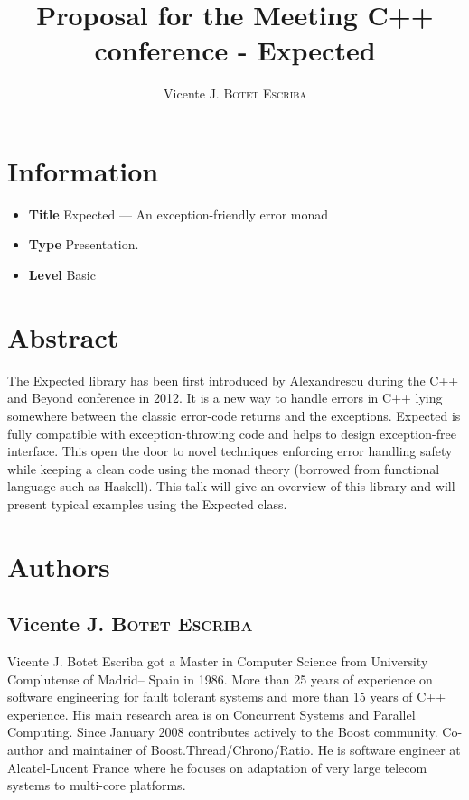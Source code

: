 \documentclass[a4paper,10pt]{article}
\title{Proposal for the Meeting C++ conference - Expected}
\author{ Vicente J. B\textsc{otet} E\textsc{scriba}}
\begin{document}
\maketitle
\section{Information}

\begin{itemize}
\item \textbf{Title} Expected — An exception-friendly error monad
\item \textbf{Type} Presentation.
\item \textbf{Level} Basic
\end{itemize}

\section{Abstract}

The Expected library has been first introduced by Alexandrescu during the C++ and Beyond conference in 2012\cite{AlexandrescuExpected}. It is a new way to handle errors in C++ lying somewhere between the classic error-code returns and the exceptions. Expected is fully compatible with exception-throwing code and helps to design exception-free interface. This open the door to novel techniques enforcing error handling safety while keeping a clean code using the monad theory (borrowed from functional language such as Haskell). This talk will give an overview of this library and will present typical examples using the Expected class.

\section{Authors}

\subsection{Vicente J. B\textsc{otet} E\textsc{scriba}}

Vicente J. Botet Escriba got a Master in Computer Science from University Complutense of Madrid– Spain in 1986. More than 25 years of experience on software engineering for fault tolerant systems and more than 15 years of C++ experience. His main research area is on Concurrent Systems and Parallel Computing. Since January 2008 contributes actively to the Boost community. Co-author and maintainer of Boost.Thread/Chrono/Ratio. He is software engineer at Alcatel-Lucent France where he focuses on adaptation of very large telecom systems to multi-core platforms.
\end{document}
